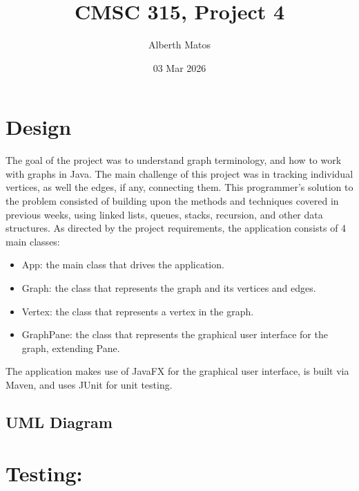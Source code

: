 \documentclass{scrartcl}
\title{CMSC 315, Project 4}
\author{Alberth Matos}
\date{03 Mar 2026}
\begin{document}
\maketitle
\tableofcontents
\thispagestyle{empty}
\newpage
\section{Design}

The goal of the project was to understand graph terminology, and how to work with graphs in Java. The main challenge of this project was in tracking individual vertices, as well the edges, if any, connecting them.  This programmer's solution to the problem consisted of building upon the methods and techniques covered in previous weeks, using linked lists, queues, stacks, recursion, and other data structures.  As directed by the project requirements, the application consists of 4 main classes:

\begin{itemize}
  \item App: the main class that drives the application.
  \item Graph: the class that represents the graph and its vertices and edges.
  \item Vertex: the class that represents a vertex in the graph.
  \item GraphPane: the class that represents the graphical user interface for the graph, extending Pane.
\end{itemize}

The application makes use of JavaFX for the graphical user interface, is built via Maven, and uses JUnit for unit testing.

\subsection{UML Diagram}

\newpage
\section{Testing:}
\end{document}
